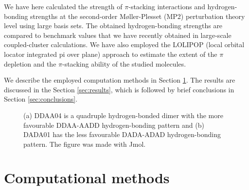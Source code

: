 \documentclass[twoside,twocolumn,9pt]{article}
\begin{document}

We have here calculated the strength of $\pi$-stacking interactions and
hydrogen-bonding strengths at the second-order
M{\o}ller-Plesset (MP2) perturbation theory level using large basis sets.
The obtained hydrogen-bonding strengths are compared to benchmark values that
we have recently obtained in large-scale coupled-cluster
calculations\cite{Usman:paper-1}. We have also employed the LOLIPOP (local
orbital locator integrated pi over plane) approach to estimate the extent of
the $\pi$ depletion and the $\pi$-stacking ability of the studied molecules.  

We describe the employed computation methods in Section \ref{sec:compmeth}.
The results are discussed in the Section \ref{sec:results}, which is followed
by brief conclusions in Section \ref{sec:conclusions}. 


\begin{figure}[H]
\centering
{}  \hspace{2mm} 
\caption{(a) DDAA04 is a quadruple hydrogen-bonded dimer with the more
favourable DDAA-AADD hydrogen-bonding pattern and (b) DADA01 has the
less favourable DADA-ADAD hydrogen-bonding pattern. The figure was made with Jmol\cite{jmol}.} 
\label{fig:figure1}
\end{figure}



\section{Computational methods}
\label{sec:compmeth}
\end{document}
